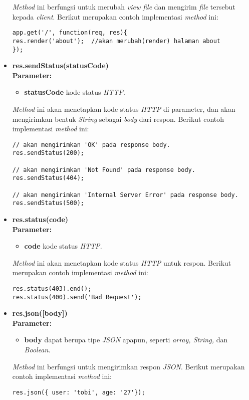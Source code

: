 \begin{itemize}
	\textit{Method} ini berfungsi untuk merubah \textit{view file} dan mengirim \textit{file} tersebut kepada \textit{client}. Berikut merupakan contoh implementasi \textit{method} ini:
\begin{lstlisting}
app.get('/', function(req, res){
res.render('about');  //akan merubah(render) halaman about 
});
\end{lstlisting}
	
	\item \textbf{res.sendStatus(statusCode)} \\ \textbf{Parameter:} 
	\begin{itemize}
		\item \textbf{statusCode} kode status \textit{HTTP}.
	\end{itemize}
	
	\textit{Method} ini akan menetapkan kode status \textit{HTTP} di parameter, dan akan mengirimkan bentuk \textit{String} sebagai \textit{body} dari respon. Berikut contoh implementasi \textit{method} ini:
\begin{lstlisting}
// akan mengirimkan 'OK' pada response body.
res.sendStatus(200); 

// akan mengirimkan 'Not Found' pada response body.
res.sendStatus(404); 

// akan mengirimkan 'Internal Server Error' pada response body.
res.sendStatus(500); 
	\end{lstlisting}
	
	\item \textbf{res.status(code)} \\ \textbf{Parameter:}
	\begin{itemize}
		\item \textbf{code} kode status \textit{HTTP}.
	\end{itemize}
	
	\textit{Method} ini akan menetapkan kode status \textit{HTTP} untuk respon. Berikut merupakan contoh implementasi \textit{method} ini:
\begin{lstlisting}
res.status(403).end();
res.status(400).send('Bad Request');
\end{lstlisting}
	
	\item \textbf{res.json([body])} \\ \textbf{Parameter:}
	\begin{itemize}
		\item \textbf{body} dapat berupa tipe \textit{JSON} apapun, seperti \textit{array, String,} dan \textit{Boolean}.
	\end{itemize}
	
	\textit{Method} ini berfungsi untuk mengirimkan respon \textit{JSON}. Berikut merupakan contoh implementasi \textit{method} ini:
\begin{lstlisting}
res.json({ user: 'tobi', age: '27'});
\end{lstlisting}
	
\end{itemize}

